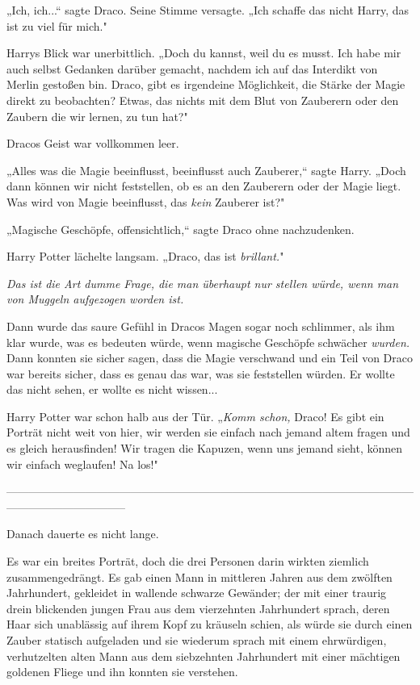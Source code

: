 {„Ich, ich...“ sagte Draco. Seine Stimme versagte. „Ich schaffe das nicht Harry, das ist zu viel für mich."

Harrys Blick war unerbittlich. „Doch du kannst, weil du es musst. Ich habe mir auch selbst Gedanken darüber gemacht, nachdem ich auf das Interdikt von Merlin gestoßen bin. Draco, gibt es irgendeine Möglichkeit, die Stärke der Magie direkt zu beobachten? Etwas, das nichts mit dem Blut von Zauberern oder den Zaubern die wir lernen, zu tun hat?"

Dracos Geist war vollkommen leer.

„Alles was die Magie beeinflusst, beeinflusst auch Zauberer,“ sagte Harry. „Doch dann können wir nicht feststellen, ob es an den Zauberern oder der Magie liegt. Was wird von Magie beeinflusst, das \emph{kein} Zauberer ist?"

„Magische Geschöpfe, offensichtlich,“ sagte Draco ohne nachzudenken.

Harry Potter lächelte langsam. „Draco, das ist \emph{brillant.}"

\emph{Das ist die Art dumme Frage, die man überhaupt nur stellen würde, wenn man von Muggeln aufgezogen worden ist.}

Dann wurde das saure Gefühl in Dracos Magen sogar noch schlimmer, als ihm klar wurde, was es bedeuten würde, wenn magische Geschöpfe schwächer \emph{wurden.} Dann konnten sie sicher sagen, dass die Magie verschwand und ein Teil von Draco war bereits sicher, dass es genau das war, was sie feststellen würden. Er wollte das nicht sehen, er wollte es nicht wissen...

Harry Potter war schon halb aus der Tür. „\emph{Komm schon,} Draco! Es gibt ein Porträt nicht weit von hier, wir werden sie einfach nach jemand altem fragen und es gleich herausfinden! Wir tragen die Kapuzen, wenn uns jemand sieht, können wir einfach weglaufen! Na los!"

--------------------------------------------------------------------------------------------------------------------------------------------

\hfill\break Danach dauerte es nicht lange.

Es war ein breites Porträt, doch die drei Personen darin wirkten ziemlich zusammengedrängt. Es gab einen Mann in mittleren Jahren aus dem zwölften Jahrhundert, gekleidet in wallende schwarze Gewänder; der mit einer traurig drein blickenden jungen Frau aus dem vierzehnten Jahrhundert sprach, deren Haar sich unablässig auf ihrem Kopf zu kräuseln schien, als würde sie durch einen Zauber statisch aufgeladen und sie wiederum sprach mit einem ehrwürdigen, verhutzelten alten Mann aus dem siebzehnten Jahrhundert mit einer mächtigen goldenen Fliege und ihn konnten sie verstehen.

}
